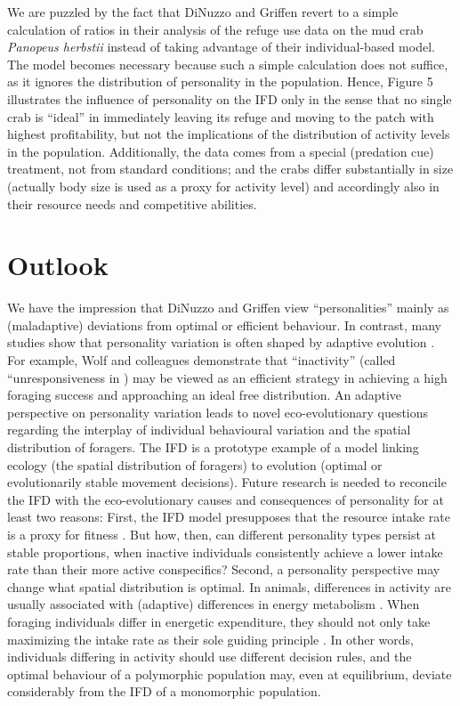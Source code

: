 	We are puzzled by the fact that DiNuzzo and Griffen revert to a simple calculation of ratios in their analysis of the refuge use data on the mud crab \textit{Panopeus herbstii} \citep{toscano2014} instead of taking advantage of their individual-based model.
	The model becomes necessary because such a simple calculation does not suffice, as it ignores the distribution of personality in the population.
	Hence, Figure 5 illustrates the influence of personality on the IFD only in the sense that no single crab is ``ideal'' in immediately leaving its refuge and moving to the patch with highest profitability, but not the implications of the distribution of activity levels in the population.
	Additionally, the data comes from a special (predation cue) treatment, not from standard conditions; and the crabs differ substantially in size (actually body size is used as a proxy for activity level) and accordingly also in their resource needs and competitive abilities. 
	
	\section*{Outlook}
	
	We have the impression that DiNuzzo and Griffen view ``personalities'' mainly as (maladaptive) deviations from optimal or efficient behaviour. In contrast, many studies show that personality variation is often shaped by adaptive evolution \citep{dall2004,wolf2007a,dingemanse2010,wolf2010,luttbegbarney2010,bergmuller2010,wolf2012}.
	For example, Wolf and colleagues \citep{wolf2008a} demonstrate that “inactivity” (called “unresponsiveness in \citep{wolf2008a}) may be viewed as an efficient strategy in achieving a high foraging success and approaching an ideal free distribution.
	An adaptive perspective on personality variation leads to novel eco-evolutionary questions regarding the interplay of individual behavioural variation and the spatial distribution of foragers.
	The IFD is a prototype example of a model linking ecology (the spatial distribution of foragers) to evolution (optimal or evolutionarily stable movement decisions).
	Future research is needed to reconcile the IFD with the eco-evolutionary causes and consequences of personality for at least two reasons: First, the IFD model presupposes that the resource intake rate is a proxy for fitness \citep{tregenza1995}.
	But how, then, can different personality types persist at stable proportions, when inactive individuals consistently achieve a lower intake rate than their more active conspecifics? 
	Second, a personality perspective may change what spatial distribution is optimal.
	In animals, differences in activity are usually associated with (adaptive) differences in energy metabolism \citep{careau2008}.
	When foraging individuals differ in energetic expenditure, they should not only take maximizing the intake rate as their sole guiding principle \citep{campos-candela2019}.
	In other words, individuals differing in activity should use different decision rules, and the optimal behaviour of a polymorphic population may, even at equilibrium, deviate considerably from the IFD of a monomorphic population.

	
\afterpage{\nopagecolor}
\pagestyle{scrheadings}
